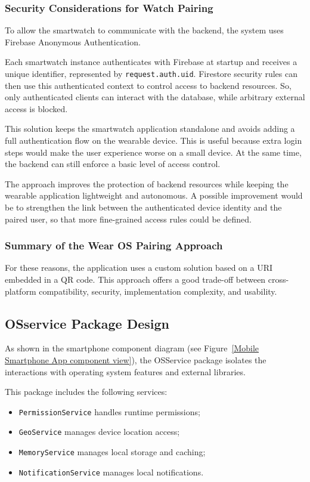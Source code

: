\subsubsection{Security Considerations for Watch Pairing}

To allow the smartwatch to communicate with the backend, the system uses Firebase Anonymous Authentication.

Each smartwatch instance authenticates with Firebase at startup and receives a unique identifier, represented by \texttt{request.auth.uid}. Firestore security rules can then use this authenticated context to control access to backend resources. So, only authenticated clients can interact with the database, while arbitrary external access is blocked.

This solution keeps the smartwatch application standalone and avoids adding a full authentication flow on the wearable device. This is useful because extra login steps would make the user experience worse on a small device. At the same time, the backend can still enforce a basic level of access control.

The approach improves the protection of backend resources while keeping the wearable application lightweight and autonomous. A possible improvement would be to strengthen the link between the authenticated device identity and the paired user, so that more fine-grained access rules could be defined.

\subsubsection{Summary of the Wear OS Pairing Approach}
For these reasons, the application uses a custom solution based on a URI embedded in a QR code. This approach offers a good trade-off between cross-platform compatibility, security, implementation complexity, and usability.
\newpage

\subsection{OSservice Package Design}
\label{OSService Package Design}
As shown in the smartphone component diagram (see Figure~\ref{Mobile Smartphone App component view}), the OSService package isolates the interactions with operating system features and external libraries.

This package includes the following services:
\begin{itemize}
\item \texttt{PermissionService} handles runtime permissions;
\item \texttt{GeoService} manages device location access;
\item \texttt{MemoryService} manages local storage and caching;
\item \texttt{NotificationService} manages local notifications.
\end{itemize}

